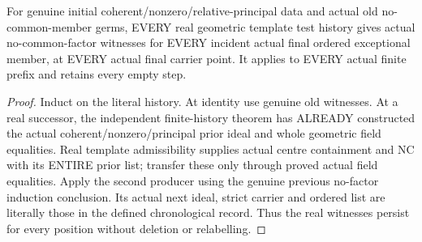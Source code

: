 \begin{theorem}
\label{hir:sharp-actual-finite-chronological-no-member-factor}
\leanok
For genuine initial coherent/nonzero/relative-principal data and actual old
no-common-member germs, EVERY real geometric template test history gives
actual no-common-factor witnesses for EVERY incident actual final ordered
exceptional member, at EVERY actual final carrier point. It applies to EVERY
actual finite prefix and retains every empty step.
\end{theorem}
\begin{proof}
Induct on the literal history. At identity use genuine old witnesses. At a
real successor, the independent finite-history theorem has ALREADY constructed
the actual coherent/nonzero/principal prior ideal and whole geometric field
equalities. Real template admissibility supplies actual centre containment
and NC with its ENTIRE prior list; transfer these only through proved actual
field equalities. Apply the second producer using the genuine previous
no-factor induction conclusion. Its actual next ideal, strict carrier and
ordered list are literally those in the defined chronological record. Thus
the real witnesses persist for every position without deletion or relabelling.
\end{proof}

